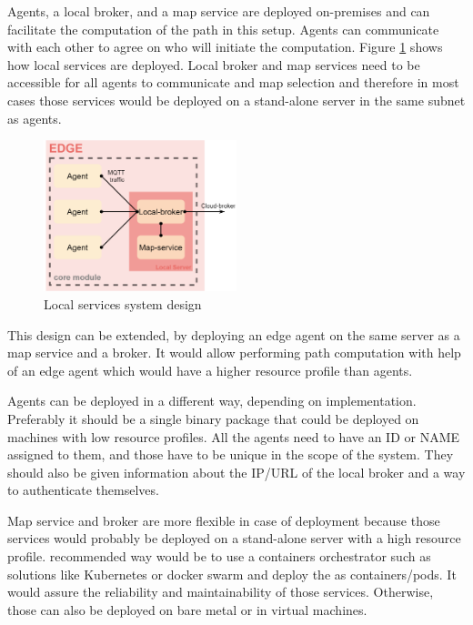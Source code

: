 Agents, a local broker, and a map service are deployed on-premises and can facilitate the computation of the path in this setup. Agents can communicate with each other to agree on who will initiate the computation. Figure \ref{fig:local_services} shows how local services are deployed. Local broker and map services need to be accessible for all agents to communicate and map selection and therefore in most cases those services would be deployed on a stand-alone server in the same subnet as agents.

\begin{figure}[H]
    \centering
    \includegraphics[width=0.5\textwidth]{pictures/local_service.png}
    \caption{Local services system design}
    \label{fig:local_services}
\end{figure}

This design can be extended, by deploying an edge agent on the same server as a map service and a broker. It would allow performing path computation with help of an edge agent which would have a higher resource profile than agents.

Agents can be deployed in a different way, depending on implementation. Preferably it should be a single binary package that could be deployed on machines with low resource profiles. All the agents need to have an ID or NAME assigned to them, and those have to be unique in the scope of the system. They should also be given information about the IP/URL of the local broker and a way to authenticate themselves. 

Map service and broker are more flexible in case of deployment because those services would probably be deployed on a stand-alone server with a high resource profile. recommended way would be to use a containers orchestrator such as solutions like Kubernetes or docker swarm and deploy the as containers/pods. It would assure the reliability and maintainability of those services. Otherwise, those can also be deployed on bare metal or in virtual machines.